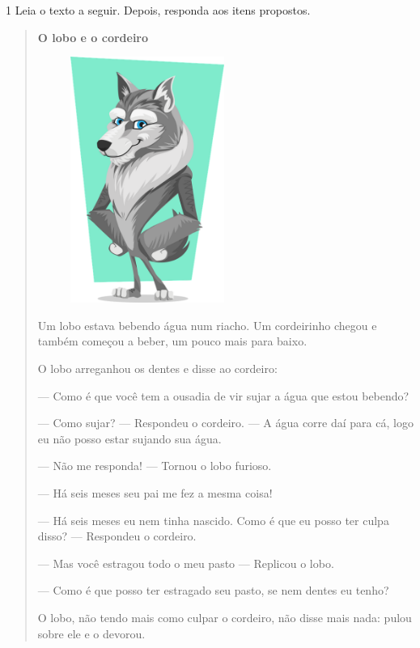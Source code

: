 \pagebreak
{}

\num{1} Leia o texto a seguir. Depois, responda aos itens propostos.


\begin{quote}
\textbf{O lobo e o cordeiro}

\begin{figure}
\includegraphics[width=1.97917in,height=3.16667in]{./media/image5.png}
\end{figure}

Um lobo estava bebendo água num riacho. Um cordeirinho chegou e também
começou a beber, um pouco mais para baixo.

O lobo arreganhou os dentes e disse ao cordeiro:

--- Como é que você tem a ousadia de vir sujar a água que estou bebendo?

--- Como sujar? --- Respondeu o cordeiro. --- A água corre daí para cá,
logo eu não posso estar sujando sua água.

--- Não me responda! --- Tornou o lobo furioso.

--- Há seis meses seu pai me fez a mesma coisa!

--- Há seis meses eu nem tinha nascido. Como é que eu posso ter culpa
disso? --- Respondeu o cordeiro.

--- Mas você estragou todo o meu pasto --- Replicou o lobo.

--- Como é que posso ter estragado seu pasto, se nem dentes eu tenho?

O lobo, não tendo mais como culpar o cordeiro, não disse mais nada:
pulou sobre ele e o devorou.

\end{quote}

